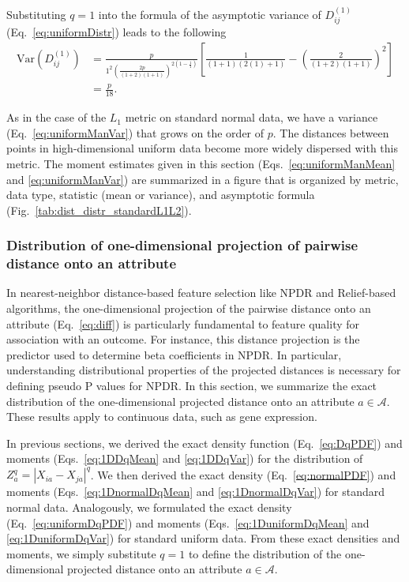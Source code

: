 \documentclass[10pt,letterpaper]{article}
\begin{document}
Substituting $q=1$ into the formula of the asymptotic variance of $D^{(1)}_{ij}$ (Eq.~\ref{eq:uniformDistr}) leads to the following
%
\begin{equation}\label{eq:uniformManVar}
\begin{aligned}
\text{Var}\left(D^{(1)}_{ij}\right) &= \frac{p}{1^2\left(\frac{2p}{(1 + 2)(1 + 1)}\right)^{2\left(1 - \frac{1}{1}\right)}}\left[\frac{1}{(1 + 1)(2(1) + 1)} - \left(\frac{2}{(1 + 2)(1 + 1)}\right)^2\right] \\
&= \frac{p}{18}.
\end{aligned}
\end{equation}

As in the case of the $L_1$ metric on standard normal data, we have a variance (Eq.~\ref{eq:uniformManVar}) that grows on the order of $p$. The distances between points in high-dimensional uniform data become more widely dispersed with this metric. The moment estimates given in this section (Eqs.~\ref{eq:uniformManMean} and \ref{eq:uniformManVar}) are summarized in a figure that is organized by metric, data type, statistic (mean or variance), and asymptotic formula (Fig.~\ref{tab:dist_distr_standardL1L2}).

\subsubsection*{Distribution of one-dimensional projection of pairwise distance onto an attribute}\label{sec:continuous_diff}

In nearest-neighbor distance-based feature selection like NPDR and Relief-based algorithms, the one-dimensional projection of the pairwise distance onto an attribute (Eq.~\ref{eq:diff}) is particularly fundamental to feature quality for association with an outcome. For instance, this distance projection is the predictor used to determine beta coefficients in NPDR. In particular, understanding distributional properties of the projected distances is necessary for defining pseudo P values for NPDR. In this section, we summarize the exact distribution of the one-dimensional projected distance onto an attribute $a \in \mathcal{A}$. These results apply to continuous data, such as gene expression. 

In previous sections, we derived the exact density function (Eq.~\ref{eq:DqPDF}) and moments (Eqs.~\ref{eq:1DDqMean} and \ref{eq:1DDqVar}) for the distribution of $Z^q_a=|X_{ia}-X_{ja}|^q$. We then derived the exact density (Eq.~\ref{eq:normalPDF}) and moments (Eqs.~\ref{eq:1DnormalDqMean} and \ref{eq:1DnormalDqVar}) for standard normal data. Analogously, we formulated the exact density (Eq.~\ref{eq:uniformDqPDF}) and moments (Eqs.~\ref{eq:1DuniformDqMean} and \ref{eq:1DuniformDqVar}) for standard uniform data. From these exact densities and moments, we simply substitute $q=1$ to define the distribution of the one-dimensional projected distance onto an attribute $a \in \mathcal{A}$.
\end{document}
